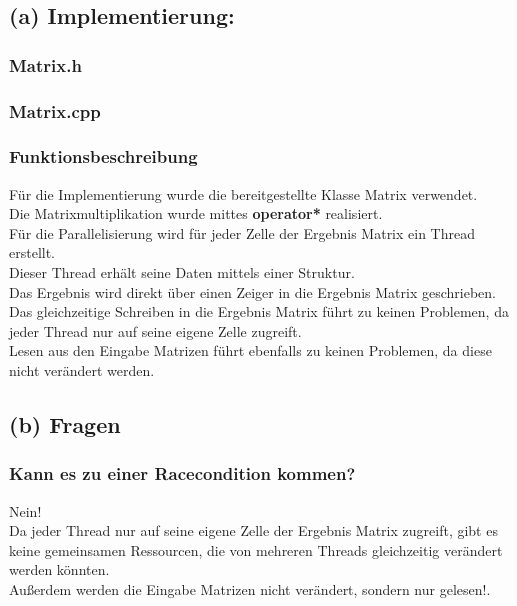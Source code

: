 \documentclass[a4paper,12pt]{article}
\begin{document}
\subsection{(a) Implementierung:}

\subsubsection{Matrix.h}

\newpage
\subsubsection{Matrix.cpp}


\subsubsection{Funktionsbeschreibung}
Für die Implementierung wurde die bereitgestellte Klasse Matrix verwendet.\\
Die Matrixmultiplikation wurde mittes \textbf{operator*} realisiert.\\
Für die Parallelisierung wird für jeder Zelle der Ergebnis Matrix ein Thread erstellt.\\
Dieser Thread erhält seine Daten mittels einer Struktur. \\
Das Ergebnis wird direkt über einen Zeiger in die Ergebnis Matrix geschrieben.\\
Das gleichzeitige Schreiben in die Ergebnis Matrix führt zu keinen Problemen, da jeder Thread nur auf seine eigene Zelle zugreift.\\ 
Lesen aus den Eingabe Matrizen führt ebenfalls zu keinen Problemen, da diese nicht verändert werden.\\

\subsection{(b) Fragen}
\subsubsection{Kann es zu einer Racecondition kommen?}
Nein!\\
Da jeder Thread nur auf seine eigene Zelle der Ergebnis Matrix zugreift, gibt es keine gemeinsamen Ressourcen, die von mehreren Threads gleichzeitig verändert werden könnten.\\
Außerdem werden die Eingabe Matrizen nicht verändert, sondern nur gelesen!.
\end{document}

